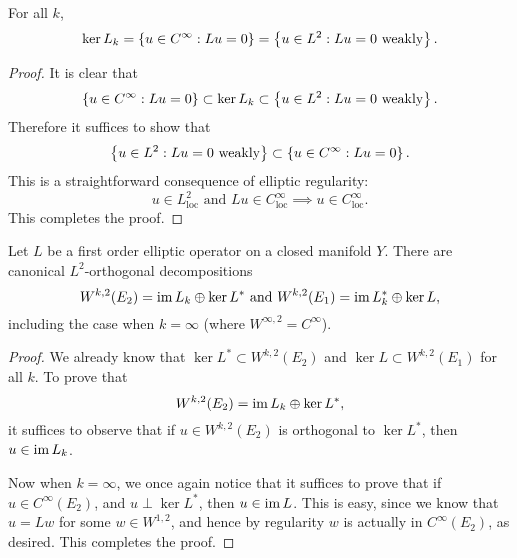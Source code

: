  \begin{prop}
   For all $k$,
   \begin{equation*}
     \ker L_{k}=\left\{u\in C^{\infty}:Lu=0\right\}=\left\{u\in L^{2}:Lu=0\text{ weakly}\right\}.
   \end{equation*}
 \end{prop}
 \begin{proof}
   It is clear that
   \begin{equation*}
     \left\{u\in C^{\infty}:Lu=0\right\}\subset \ker L_{k}\subset \left\{u\in L^{2}:Lu=0\text{ weakly}\right\}.
   \end{equation*}
   Therefore it suffices to show that
   \begin{equation*}
     \left\{u\in L^{2}:Lu=0\text{ weakly}\right\}\subset \left\{u\in C^{\infty}:Lu=0\right\}.
   \end{equation*}
   This is a straightforward consequence of elliptic regularity:
   \begin{equation*}
     u\in L^{2}_{\text{loc}}\text{ and }Lu\in
     C^{\infty}_{\text{loc}}\implies u\in C^{\infty}_{\text{loc}}.
   \end{equation*}
   This completes the proof.
 \end{proof}
 \begin{cor}
   Let $L$ be a first order elliptic operator on a closed manifold
   $Y$. There are canonical $L^{2}$-orthogonal decompositions
   \begin{equation*}
     W^{k,2}(E_{2})=\operatorname{\mathrm{im}} L_{k}\oplus \ker L^{*}\text{ and
     }W^{k,2}(E_{1})=\operatorname{\mathrm{im}} L^{*}_{k}\oplus \ker L,
   \end{equation*}
   including the case when $k=\infty$ (where $W^{\infty,2}=C^{\infty}$).   
 \end{cor}
 \begin{proof}
   We already know that $\ker L^{*}\subset W^{k,2}(E_{2})$ and $\ker
   L\subset W^{k,2}(E_{1})$ for all $k$. To prove that
   \begin{equation*}
     W^{k,2}(E_{2})=\operatorname{\mathrm{im}} L_{k}\oplus \ker L^{*},
   \end{equation*}
   it suffices to observe that if $u\in W^{k,2}(E_{2})$ is orthogonal
   to $\ker L^{*}$, then $u\in \operatorname{\mathrm{im}} L_{k}$.

   Now when $k=\infty$, we once again notice that it suffices to prove
   that if $u\in C^{\infty}(E_{2})$, and $u\perp \ker L^{*}$, then
   $u\in \operatorname{\mathrm{im}} L$. This is easy, since we know that $u=Lw$ for some
   $w\in W^{1,2}$, and hence by regularity $w$ is actually in
   $C^{\infty}(E_{2})$, as desired. This completes the proof.
 \end{proof}

